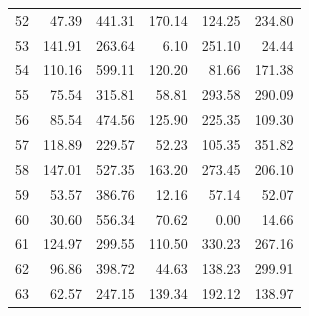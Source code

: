 \begin{longtable}{rrrrrr}
52 & 47.39 & 441.31 & 170.14 & 124.25 & 234.80 \\
53 & 141.91 & 263.64 & 6.10 & 251.10 & 24.44 \\
54 & 110.16 & 599.11 & 120.20 & 81.66 & 171.38 \\
55 & 75.54 & 315.81 & 58.81 & 293.58 & 290.09 \\
56 & 85.54 & 474.56 & 125.90 & 225.35 & 109.30 \\
57 & 118.89 & 229.57 & 52.23 & 105.35 & 351.82 \\
58 & 147.01 & 527.35 & 163.20 & 273.45 & 206.10 \\
59 & 53.57 & 386.76 & 12.16 & 57.14 & 52.07 \\
60 & 30.60 & 556.34 & 70.62 & 0.00 & 14.66 \\
61 & 124.97 & 299.55 & 110.50 & 330.23 & 267.16 \\
62 & 96.86 & 398.72 & 44.63 & 138.23 & 299.91 \\
63 & 62.57 & 247.15 & 139.34 & 192.12 & 138.97 \\
\bottomrule
\end{longtable}
